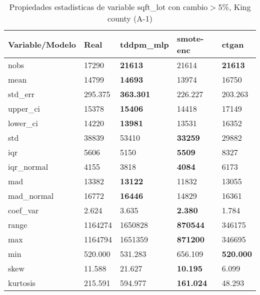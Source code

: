 \begin{table}[H]
\centering
\fontsize{8}{14}\selectfont
\caption{Propiedades estadisticas de variable sqft\_lot con cambio\ensuremath{>}5\%, King county (A-1)}
\label{table-stats-king county-a-1-sqft_lot-short}
\begin{tabular}{|l|m{10em}|m{10em}|m{10em}|m{10em}|}
\hline
 \rowcolor[gray]{0.8}
Variable/Modelo & Real & tddpm\_mlp & smote-enc & ctgan \\
\hline nobs & 17290 & \bfseries 21613 & \cellcolor[rgb]{0.9, 0.54, 0.52} 21614 & \bfseries 21613 \\
\hline mean & 14799 & \bfseries 14693 & 13974 & \cellcolor[rgb]{0.9, 0.54, 0.52} 16750 \\
\hline std\_err & 295.375 & \bfseries 363.301 & 226.227 & \cellcolor[rgb]{0.9, 0.54, 0.52} 203.263 \\
\hline upper\_ci & 15378 & \bfseries 15406 & 14418 & \cellcolor[rgb]{0.9, 0.54, 0.52} 17149 \\
\hline lower\_ci & 14220 & \bfseries 13981 & 13531 & \cellcolor[rgb]{0.9, 0.54, 0.52} 16352 \\
\hline std & 38839 & \cellcolor[rgb]{0.9, 0.54, 0.52} 53410 & \bfseries 33259 & 29882 \\
\hline iqr & 5606 & 5150 & \bfseries 5509 & \cellcolor[rgb]{0.9, 0.54, 0.52} 8327 \\
\hline iqr\_normal & 4155 & 3818 & \bfseries 4084 & \cellcolor[rgb]{0.9, 0.54, 0.52} 6173 \\
\hline mad & 13382 & \bfseries 13122 & \cellcolor[rgb]{0.9, 0.54, 0.52} 11832 & 13055 \\
\hline mad\_normal & 16772 & \bfseries 16446 & \cellcolor[rgb]{0.9, 0.54, 0.52} 14829 & 16361 \\
\hline coef\_var & 2.624 & \cellcolor[rgb]{0.9, 0.54, 0.52} 3.635 & \bfseries 2.380 & 1.784 \\
\hline range & 1164274 & 1650828 & \bfseries 870544 & \cellcolor[rgb]{0.9, 0.54, 0.52} 346175 \\
\hline max & 1164794 & 1651359 & \bfseries 871200 & \cellcolor[rgb]{0.9, 0.54, 0.52} 346695 \\
\hline min & 520.000 & 531.283 & \cellcolor[rgb]{0.9, 0.54, 0.52} 656.109 & \bfseries 520.000 \\
\hline skew & 11.588 & \cellcolor[rgb]{0.9, 0.54, 0.52} 21.627 & \bfseries 10.195 & 6.099 \\
\hline kurtosis & 215.591 & \cellcolor[rgb]{0.9, 0.54, 0.52} 594.977 & \bfseries 161.024 & 48.293 \\

\end{tabular}
\end{table}
